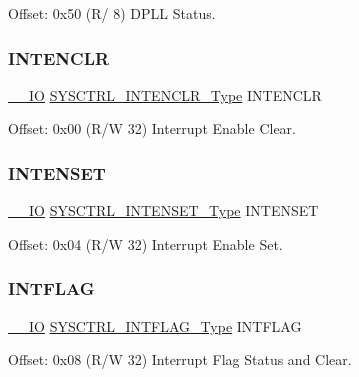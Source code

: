 Offset\+: 0x50 (R/ 8) D\+P\+LL Status. 

\mbox{\label{struct_sysctrl_a1d808a00eac38e52b0109553dc0f6146}} 
\subsubsection{\texorpdfstring{INTENCLR}{INTENCLR}}
{\footnotesize\ttfamily \mbox{\hyperlink{core__cm0plus_8h_aec43007d9998a0a0e01faede4133d6be}{\+\_\+\+\_\+\+IO}} \mbox{\hyperlink{union_s_y_s_c_t_r_l___i_n_t_e_n_c_l_r___type}{S\+Y\+S\+C\+T\+R\+L\+\_\+\+I\+N\+T\+E\+N\+C\+L\+R\+\_\+\+Type}} I\+N\+T\+E\+N\+C\+LR}



Offset\+: 0x00 (R/W 32) Interrupt Enable Clear. 

\mbox{\label{struct_sysctrl_aa6b27c37a7c7adbbd42c718eb0f6754b}} 
\subsubsection{\texorpdfstring{INTENSET}{INTENSET}}
{\footnotesize\ttfamily \mbox{\hyperlink{core__cm0plus_8h_aec43007d9998a0a0e01faede4133d6be}{\+\_\+\+\_\+\+IO}} \mbox{\hyperlink{union_s_y_s_c_t_r_l___i_n_t_e_n_s_e_t___type}{S\+Y\+S\+C\+T\+R\+L\+\_\+\+I\+N\+T\+E\+N\+S\+E\+T\+\_\+\+Type}} I\+N\+T\+E\+N\+S\+ET}



Offset\+: 0x04 (R/W 32) Interrupt Enable Set. 

\mbox{\label{struct_sysctrl_a325bea42d801793b8a4d7bee7f450a2d}} 
\subsubsection{\texorpdfstring{INTFLAG}{INTFLAG}}
{\footnotesize\ttfamily \mbox{\hyperlink{core__cm0plus_8h_aec43007d9998a0a0e01faede4133d6be}{\+\_\+\+\_\+\+IO}} \mbox{\hyperlink{union_s_y_s_c_t_r_l___i_n_t_f_l_a_g___type}{S\+Y\+S\+C\+T\+R\+L\+\_\+\+I\+N\+T\+F\+L\+A\+G\+\_\+\+Type}} I\+N\+T\+F\+L\+AG}



Offset\+: 0x08 (R/W 32) Interrupt Flag Status and Clear. 

